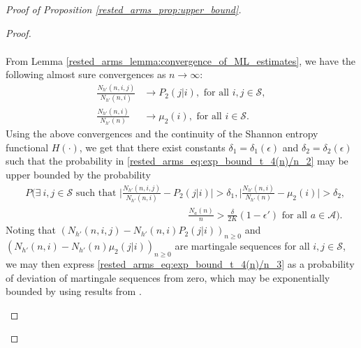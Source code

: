 \begin{proof}[Proof of Proposition \ref{rested_arms_prop:upper_bound}]
\begin{proof}
\begin{enumerate}
\begin{align}
\end{align}\endgroup
From Lemma \ref{rested_arms_lemma:convergence_of_ML_estimates}, we have the following almost sure convergences as $n\to\infty$:
\begingroup\allowdisplaybreaks\begin{align}
	\frac{N_{h'}(n,i,j)}{N_{h'}(n,i)}&\to P_2(j|i),\text{ for all }i,j\in\mathcal{S},\nonumber\\
	\frac{N_{h'}(n,i)}{N_{h'}(n)}&\to \mu_2(i),\text{ for all }i\in\mathcal{S}.
\end{align}\endgroup
Using the above convergences and the continuity of the Shannon entropy functional $H(\cdot)$, we get that there exist constants $\delta_1=\delta_1(\epsilon)$ and $\delta_2=\delta_2(\epsilon)$ such that the probability in \eqref{rested_arms_eq:exp_bound_t_4(n)/n_2} may be upper bounded by the probability
\begingroup\allowdisplaybreaks\begin{align}
	&P\bigg(\exists~i,j\in\mathcal{S}\text{ such that }
	\bigg|\frac{N_{h'}(n,i,j)}{N_{h'}(n,i)}-P_2(j|i)\bigg|>\delta_1,\bigg|\frac{N_{h'}(n,i)}{N_{h'}(n)}-\mu_2(i)\bigg|>\delta_2,\nonumber\\
	&\hspace{7cm}
	\frac{N_a(n)}{n}>\frac{\delta}{2K}(1-\epsilon')\text{ for all }a\in\mathcal{A}\bigg).\label{rested_arms_eq:exp_bound_t_4(n)/n_3}
\end{align}\endgroup
Noting that $(N_{h'}(n,i,j)-N_{h'}(n,i)P_2(j|i))_{n\geq 0}$ and $(N_{h'}(n,i)-N_{h'}(n)\mu_2(j|i))_{n\geq 0}$ are martingale sequences for all $i,j\in\mathcal{S}$, we may then express \eqref{rested_arms_eq:exp_bound_t_4(n)/n_3} as a probability of deviation of martingale sequences from zero, which may be exponentially bounded by using results from \cite[Theorem 1.2A]{Victor1999}.



\end{enumerate}
\end{proof}
\end{proof}
